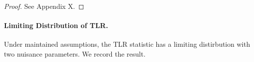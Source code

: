 \begin{proof}
    See Appendix X.
\end{proof}




\paragraph*{Limiting Distribution of TLR.}

Under maintained assumptions, the TLR statistic has a limiting distirbution with two nuisance parameters. We record the result.




